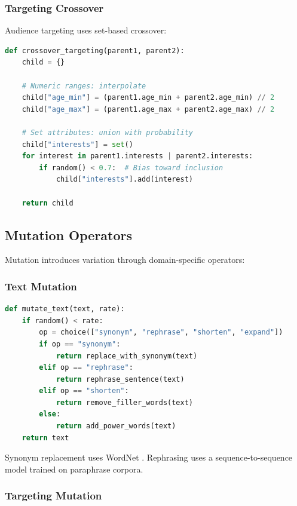 \subsubsection{Targeting Crossover}

Audience targeting uses set-based crossover:

\begin{lstlisting}[language=Python,caption=Audience crossover]
def crossover_targeting(parent1, parent2):
    child = {}

    # Numeric ranges: interpolate
    child["age_min"] = (parent1.age_min + parent2.age_min) // 2
    child["age_max"] = (parent1.age_max + parent2.age_max) // 2

    # Set attributes: union with probability
    child["interests"] = set()
    for interest in parent1.interests | parent2.interests:
        if random() < 0.7:  # Bias toward inclusion
            child["interests"].add(interest)

    return child
\end{lstlisting}

\subsection{Mutation Operators}

Mutation introduces variation through domain-specific operators:

\subsubsection{Text Mutation}

\begin{lstlisting}[language=Python,caption=Text mutation operators]
def mutate_text(text, rate):
    if random() < rate:
        op = choice(["synonym", "rephrase", "shorten", "expand"])
        if op == "synonym":
            return replace_with_synonym(text)
        elif op == "rephrase":
            return rephrase_sentence(text)
        elif op == "shorten":
            return remove_filler_words(text)
        else:
            return add_power_words(text)
    return text
\end{lstlisting}

Synonym replacement uses WordNet \cite{wordnet1995}. Rephrasing uses a sequence-to-sequence model trained on paraphrase corpora.

\subsubsection{Targeting Mutation}

